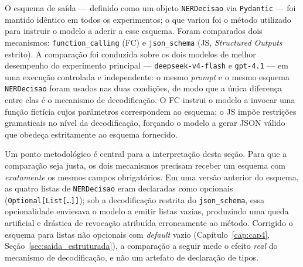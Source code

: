 O esquema de saída --- definido como um objeto \texttt{NERDecisao} via \texttt{Pydantic} --- foi mantido idêntico em todos os experimentos; o que variou foi o método utilizado para instruir o modelo a aderir a esse esquema. Foram comparados dois mecanismos: \texttt{function\_calling} (FC) e \texttt{json\_schema} (JS, \textit{Structured Outputs} estrito). A comparação foi conduzida sobre os dois modelos de melhor desempenho do experimento principal --- \texttt{deepseek-v4-flash} e \texttt{gpt-4.1} --- em uma execução controlada e independente: o mesmo \textit{prompt} e o mesmo esquema \texttt{NERDecisao} foram usados nas duas condições, de modo que a única diferença entre elas é o mecanismo de decodificação. O FC instrui o modelo a invocar uma função fictícia cujos parâmetros correspondem ao esquema; o JS impõe restrições gramaticais no nível da decodificação, forçando o modelo a gerar JSON válido que obedeça estritamente ao esquema fornecido.

Um ponto metodológico é central para a interpretação desta seção. Para que a comparação seja justa, os dois mecanismos precisam receber um esquema com \emph{exatamente} os mesmos campos obrigatórios. Em uma versão anterior do esquema, as quatro listas de \texttt{NERDecisao} eram declaradas como opcionais (\texttt{Optional[List[\ldots]]}); sob a decodificação restrita do \texttt{json\_schema}, essa opcionalidade enviesava o modelo a emitir listas vazias, produzindo uma queda artificial e drástica de revocação atribuída erroneamente ao método. Corrigido o esquema para listas não opcionais com \textit{default} vazio (Capítulo~\ref{cap:cap4}, Seção~\ref{sec:saida_estruturada}), a comparação a seguir mede o efeito \emph{real} do mecanismo de decodificação, e não um artefato de declaração de tipos.

